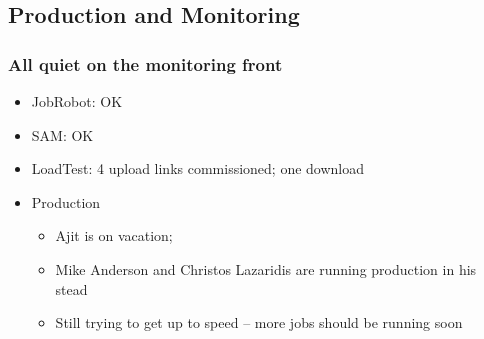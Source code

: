 \documentclass{beamer}
\begin{document}
\subsection{Production and Monitoring}
\begin{frame}
\frametitle{All quiet on the monitoring front}
\begin{itemize}
    \item JobRobot: OK
    \item SAM: OK
    \item LoadTest: 4 upload links commissioned; one download
    \item Production
    \begin{itemize}
        \item Ajit is on vacation; 
        \item Mike Anderson and Christos Lazaridis are running production in his stead
        \item Still trying to get up to speed -- more jobs should be running soon
    \end{itemize}
\end{itemize}
\end{frame}
\end{document}
